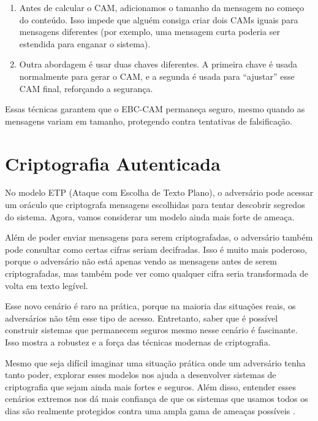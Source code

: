 \begin{enumerate}
\item Antes de calcular o CAM, adicionamos o tamanho da mensagem no começo do conteúdo.
  Isso impede que alguém consiga criar dois CAMs iguais para mensagens diferentes (por exemplo, uma mensagem curta poderia ser estendida para enganar o sistema).
\item Outra abordagem é usar duas chaves diferentes.
  A primeira chave é usada normalmente para gerar o CAM, e a segunda é usada para ``ajustar'' esse CAM final, reforçando a segurança.
\end{enumerate}

Essas técnicas garantem que o EBC-CAM permaneça seguro, mesmo quando as mensagens variam em tamanho, protegendo contra tentativas de falsificação.


\section{Criptografia Autenticada}
\label{label}

No modelo ETP (Ataque com Escolha de Texto Plano), o adversário pode acessar um oráculo que criptografa mensagens escolhidas para tentar descobrir segredos do sistema.
Agora, vamos considerar um modelo ainda mais forte de ameaça.

Além de poder enviar mensagens para serem criptografadas, o adversário também pode consultar como certas cifras seriam decifradas.
Isso é muito mais poderoso, porque o adversário não está apenas vendo as mensagens antes de serem criptografadas, mas também pode ver como qualquer cifra seria transformada de volta em texto legível.

Esse novo cenário é raro na prática, porque na maioria das situações reais, os adversários não têm esse tipo de acesso. Entretanto, saber que é possível construir sistemas que permanecem seguros mesmo nesse cenário é fascinante. Isso mostra a robustez e a força das técnicas modernas de criptografia.

Mesmo que seja difícil imaginar uma situação prática onde um adversário tenha tanto poder, explorar esses modelos nos ajuda a desenvolver sistemas de criptografia que sejam ainda mais fortes e seguros.
Além disso, entender esses cenários extremos nos dá mais confiança de que os sistemas que usamos todos os dias são realmente protegidos contra uma ampla gama de ameaças possíveis \cite{Naor90}.

